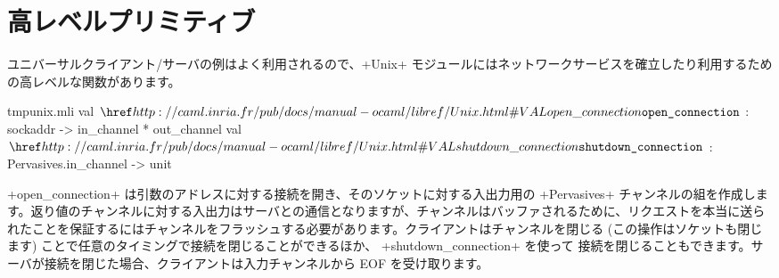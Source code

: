 \section{高レベルプリミティブ}

ユニバーサルクライアント/サーバの例はよく利用されるので、\ml+Unix+ モジュールにはネットワークサービスを確立したり利用するための高レベルな関数があります。
%
\begin{listingcodefile}{tmpunix.mli}
val $\indexlibvalue{Unix}{open\_connection}$ : sockaddr -> in_channel * out_channel
val $\indexlibvalue{Unix}{shutdown\_connection}$ : Pervasives.in_channel -> unit
\end{listingcodefile}
%
\ml+open_connection+ は引数のアドレスに対する接続を開き、そのソケットに対する入出力用の \ml+Pervasives+ チャンネルの組を作成します。返り値のチャンネルに対する入出力はサーバとの通信となりますが、チャンネルはバッファされるために、リクエストを本当に送られたことを保証するにはチャンネルをフラッシュする必要があります。クライアントはチャンネルを閉じる (この操作はソケットも閉じます) ことで任意のタイミングで接続を閉じることができるほか、 \ml+shutdown_connection+ を使って  接続を閉じることもできます。サーバが接続を閉じた場合、クライアントは入力チャンネルから EOF を受け取ります。

